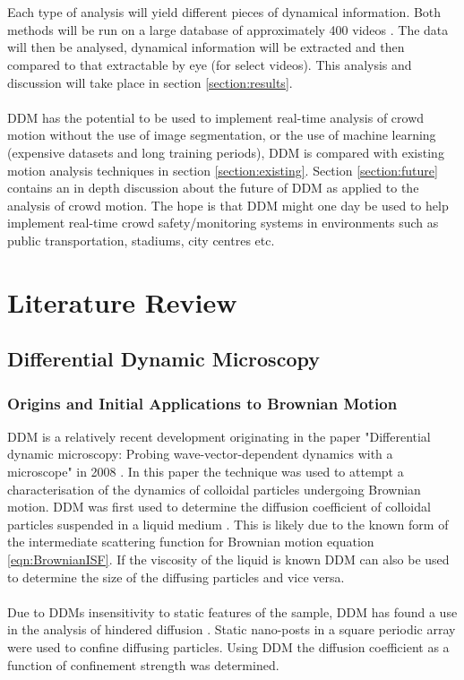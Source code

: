 \documentclass[10pt]{article}
\begin{document}
\\\\
Each type of analysis will yield different pieces of dynamical information. Both methods will be run on a large database of approximately 400 videos \cite{crowdMotionDB}. The data will then be analysed, dynamical information will be extracted and then compared to that extractable by eye (for select videos). This analysis and discussion will take place in section \ref{section:results}.
\\\\
DDM has the potential to be used to implement real-time analysis of crowd motion without the use of image segmentation, or the use of machine learning (expensive datasets and long training periods), DDM is compared with existing motion analysis techniques in section \ref{section:existing}. Section \ref{section:future} contains an in depth discussion about the future of DDM as applied to the analysis of crowd motion. The hope is that DDM might one day be used to help implement real-time crowd safety/monitoring systems in environments such as public transportation, stadiums, city centres etc.

\section{Literature Review}
\subsection{Differential Dynamic Microscopy}
\subsubsection{Origins and Initial Applications to Brownian Motion}
DDM is a relatively recent development originating in the paper "Differential dynamic microscopy: Probing wave-vector-dependent dynamics with a microscope" in 2008 \cite{ddm0}. In this paper the technique was used to attempt a characterisation of the dynamics of colloidal particles undergoing Brownian motion. DDM was first used to determine the diffusion coefficient of colloidal particles suspended in a liquid medium \cite{ddm0} \cite{ddm_maths}. This is likely due to the known form of the intermediate scattering function for Brownian motion equation \ref{eqn:BrownianISF}. If the viscosity of the liquid is known DDM can also be used to determine the size of the diffusing particles \cite{ddm1} and vice versa. 
\\\\
Due to DDMs insensitivity to static features of the sample, DDM has found a use in the analysis of hindered diffusion \cite{nanoposts}. Static nano-posts in a square periodic array were used to confine diffusing particles. Using DDM the diffusion coefficient as a function of confinement strength was determined.
\end{document}
